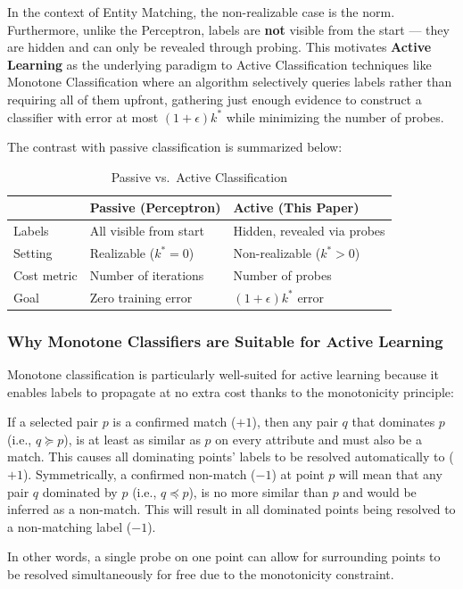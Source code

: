 \documentclass[11pt, a4paper]{article}
\theoremstyle{boxed}
\begin{document}
In the context of Entity Matching, the non-realizable case is the norm. Furthermore, unlike the Perceptron, labels are \textbf{not} visible from the start --- they are hidden and can only be revealed through probing. This motivates \textbf{Active Learning} as the underlying paradigm to Active Classification techniques like Monotone Classification where an algorithm selectively queries labels rather than requiring all of them upfront, gathering just enough evidence to construct a classifier with error at most $(1+\epsilon)k^*$ while minimizing the number of probes.

The contrast with passive classification is summarized below:

\begin{table}[h]
\centering
\begin{tabular}{lll}
\hline
 & \textbf{Passive (Perceptron)} & 
 \textbf{Active (This Paper)} \\
\hline
Labels & All visible from start & Hidden, revealed via probes \\
Setting & Realizable ($k^* = 0$) & Non-realizable ($k^* > 0$) \\
Cost metric & Number of iterations & Number of probes \\
Goal & Zero training error & $(1+\epsilon)k^*$ error \\
\hline
\end{tabular}
\caption{Passive vs.\ Active Classification}
\end{table}

\subsubsection{Why Monotone Classifiers are Suitable for Active Learning}
Monotone classification is particularly well-suited for active learning because it enables labels to propagate at no extra cost thanks to the monotonicity principle:

If a selected pair $p$ is a confirmed match ($+1$), then any pair $q$ that dominates $p$ (i.e., $q \succeq p$), is at least as similar as $p$ on every attribute and must also be a match. This causes all dominating points' labels to be resolved automatically to ($+1$). Symmetrically, a confirmed non-match ($-1$) at point $p$ will mean that any pair $q$ dominated by $p$ (i.e., $q \preceq p$), is no more similar than $p$ and would be inferred as a non-match. This will result in all dominated points being resolved to a non-matching label ($-1$).

In other words, a single probe on one point can allow for surrounding points to be resolved simultaneously for free due to the monotonicity constraint.
\end{document}
